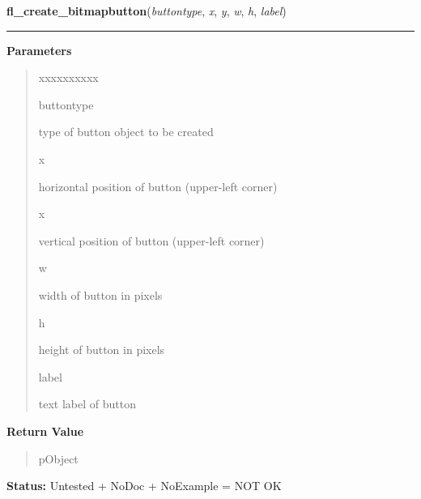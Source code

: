     \label{xformslib:library:fl_create_bitmapbutton}

    \vspace{0.5ex}

\hspace{.8\funcindent}\begin{boxedminipage}{\funcwidth}

    \raggedright \textbf{fl\_create\_bitmapbutton}(\textit{buttontype}, \textit{x}, \textit{y}, \textit{w}, \textit{h}, \textit{label})

    \vspace{-1.5ex}

    \rule{\textwidth}{0.5\fboxrule}
\setlength{\parskip}{2ex}
\setlength{\parskip}{1ex}
      \textbf{Parameters}
      \vspace{-1ex}

      \begin{quote}
        \begin{Ventry}{xxxxxxxxxx}

          \item[buttontype]

          type of button object to be created

          \item[x]

          horizontal position of button (upper-left corner)

          \item[x]

          vertical position of button (upper-left corner)

          \item[w]

          width of button in pixels

          \item[h]

          height of button in pixels

          \item[label]

          text label of button

        \end{Ventry}

      \end{quote}

      \textbf{Return Value}
    \vspace{-1ex}

      \begin{quote}
      pObject

      \end{quote}

\textbf{Status:} Untested + NoDoc + NoExample = NOT OK



    \end{boxedminipage}

